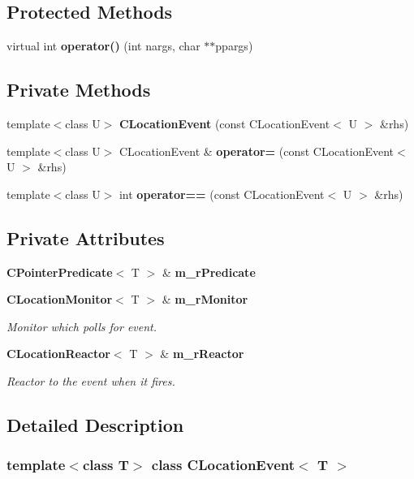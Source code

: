 \subsection*{Protected Methods}
\begin{CompactItemize}
\item 
virtual int {\bf operator()} (int nargs, char $\ast$$\ast$ppargs)
\end{CompactItemize}
\subsection*{Private Methods}
\begin{CompactItemize}
\item 
template$<$class U$>$ {\bf CLocation\-Event} (const CLocation\-Event$<$ U $>$ \&rhs)
\item 
template$<$class U$>$ CLocation\-Event \& {\bf operator=} (const CLocation\-Event$<$ U $>$ \&rhs)
\item 
template$<$class U$>$ int {\bf operator==} (const CLocation\-Event$<$ U $>$ \&rhs)
\end{CompactItemize}
\subsection*{Private Attributes}
\begin{CompactItemize}
\item 
{\bf CPointer\-Predicate}$<$ T $>$ \& {\bf m\_\-r\-Predicate}
\item 
{\bf CLocation\-Monitor}$<$ T $>$ \& {\bf m\_\-r\-Monitor}
\begin{CompactList}\small\item\em Monitor which polls for event.\item\end{CompactList}\item 
{\bf CLocation\-Reactor}$<$ T $>$ \& {\bf m\_\-r\-Reactor}
\begin{CompactList}\small\item\em Reactor to the event when it fires.\item\end{CompactList}\end{CompactItemize}


\subsection{Detailed Description}
\subsubsection*{template$<$class T$>$ class CLocation\-Event$<$ T $>$}

